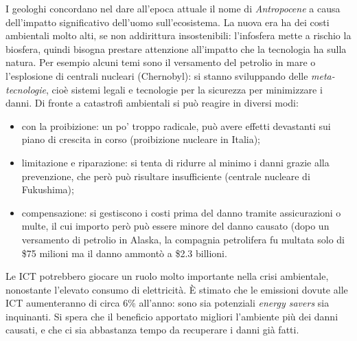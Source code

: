 \documentclass[a4page, 11pt]{article}
\begin{document}
I geologhi concordano nel dare all'epoca attuale il nome di \textit{Antropocene} a causa dell'impatto significativo dell'uomo sull'ecosistema.
La nuova era ha dei costi ambientali  molto alti, se non addirittura insostenibili: l'infosfera mette a rischio la biosfera, quindi bisogna prestare attenzione all'impatto che la tecnologia ha sulla natura.
Per esempio alcuni temi sono il versamento del petrolio in mare o l'esplosione di centrali nucleari (Chernobyl): si stanno sviluppando delle \textit{meta-tecnologie}, cioè  sistemi legali e tecnologie per la sicurezza per minimizzare i danni.
Di fronte a catastrofi ambientali si può reagire in diversi modi:
\begin{itemize}
  \item con la proibizione: un po' troppo radicale, può avere effetti devastanti sui piano di crescita in corso (proibizione nucleare in Italia);
  \item limitazione e riparazione: si tenta di ridurre al minimo i danni grazie alla prevenzione, che però può risultare insufficiente (centrale nucleare di Fukushima);
  \item compensazione: si gestiscono i costi prima del danno tramite assicurazioni o multe, il cui importo però può essere minore del danno causato (dopo un versamento di petrolio in Alaska, la compagnia petrolifera fu multata solo di \$75 milioni ma il danno ammontò a \$2.3 billioni.
\end{itemize}

Le ICT  potrebbero giocare un ruolo molto importante nella crisi ambientale, nonostante l'elevato consumo di elettricità.
È stimato che le emissioni dovute alle ICT aumenteranno di circa 6\% all'anno:  sono sia potenziali \textit{energy savers} sia inquinanti.
Si spera che il beneficio apportato migliori l'ambiente più dei danni causati, e che ci sia abbastanza tempo da recuperare i danni già fatti.
\end{document}

